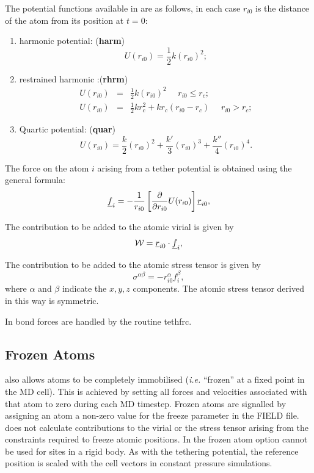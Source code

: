 The potential functions available in \D{} are as
follows, in each case $r_{i0}$ is the distance of the atom from its position at $t=0$:
\begin{enumerate}
\item harmonic potential: ({\bf harm})
\begin{equation}
U(r_{i0}) = \frac{1}{2}k(r_{i0})^2;
\end{equation}
\item restrained harmonic :({\bf rhrm})
\begin{eqnarray}
U(r_{i0})&=&\frac{1}{2}k(r_{i0})^2~~~~~~r_{i0}\le r_{c};\\
U(r_{i0})&=&\frac{1}{2}kr_{c}^2+kr_{c}(r_{i0}-r_{c})~~~~~~r_{i0}>r_{c};
\end{eqnarray}
\item Quartic potential: ({\bf quar})
\begin{equation}
U(r_{i0})=\frac{k}{2}(r_{i0})^2+\frac{k'}{3}(r_{i0})^3+\frac{k''}{4}(r_{i0})^4.
\end{equation}
\end{enumerate}

The force on the atom $i$ arising from a tether potential is obtained
using the general formula:
\begin{equation}
\mbox{$\underline{f}$}_{i}=-\frac{1}{r_{i0}}\left[
\frac{\partial }{\partial r_{i0}}U(r_{i0})\right]\mbox{$\underline{r}$}_{i0},
\end{equation}

The contribution to be added to the atomic virial is given by
\begin{equation}
{\cal W}=\mbox{$\underline{r}$}_{i0}\cdot \mbox{$\underline{f}$}_{i},
\end{equation}

The contribution to be added to the atomic stress tensor is
given by
\begin{equation}
\sigma^{\alpha \beta}=-r_{i0}^{\alpha}f_{i}^{\beta},
\end{equation}
where $\alpha$ and $\beta$ indicate the $x,y,z$ components. The atomic
stress tensor derived in this way is symmetric.

In \D{} bond forces are handled by the routine {\sc tethfrc}.

\subsection{Frozen Atoms}
\D{} also allows atoms to be completely immobilised ({\em i.e.}
``frozen'' at a fixed point in the MD cell). This is achieved by
setting all forces and velocities associated with that atom to zero
during each MD timestep.  Frozen atoms are signalled by assigning an
atom a non-zero value for the freeze parameter in the FIELD file.  \D{}
does not calculate contributions to the virial or the stress
tensor
arising from the constraints required to freeze atomic positions. In
\D{} the frozen atom option cannot be used for sites in a rigid
body. As with the tethering potential, the reference position is scaled with
the cell vectors in constant pressure simulations.

